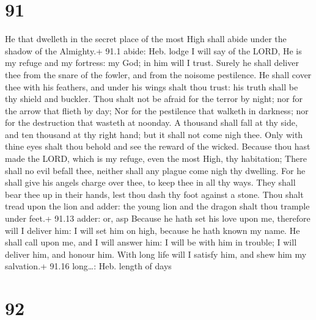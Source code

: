 \hypertarget{section-90}{%
\section{91}\label{section-90}}

 He that dwelleth in the secret place of the most High shall
abide under the shadow of the Almighty.+ 91.1 abide: Heb. lodge
 I will say of the LORD, He is my refuge and my fortress: my
God; in him will I trust.  Surely he shall deliver thee from
the snare of the fowler, and from the noisome pestilence. 
He shall cover thee with his feathers, and under his wings shalt thou
trust: his truth shall be thy shield and buckler.  Thou
shalt not be afraid for the terror by night; nor for the arrow that
flieth by day;  Nor for the pestilence that walketh in
darkness; nor for the destruction that wasteth at noonday. 
A thousand shall fall at thy side, and ten thousand at thy right hand;
but it shall not come nigh thee.  Only with thine eyes shalt
thou behold and see the reward of the wicked.  Because thou
hast made the LORD, which is my refuge, even the most High, thy
habitation;  There shall no evil befall thee, neither shall
any plague come nigh thy dwelling.  For he shall give his
angels charge over thee, to keep thee in all thy ways. 
They shall bear thee up in their hands, lest thou dash thy foot against
a stone.  Thou shalt tread upon the lion and adder: the
young lion and the dragon shalt thou trample under feet.+ 91.13 adder:
or, asp  Because he hath set his love upon me, therefore
will I deliver him: I will set him on high, because he hath known my
name.  He shall call upon me, and I will answer him: I will
be with him in trouble; I will deliver him, and honour him.
 With long life will I satisfy him, and shew him my
salvation.+ 91.16 long\ldots: Heb. length of days

\hypertarget{section-91}{%
\section{92}\label{section-91}}

